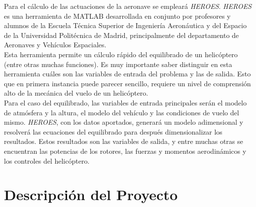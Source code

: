 Para el cálculo de las actuaciones de la aeronave se empleará \emph{HEROES}.
\emph{HEROES} es una herramienta de MATLAB desarrollada en conjunto por profesores y alumnos de la Escuela Técnica Superior de Ingeniería Aeronáutica y del Espacio de la Universidad Politécnica de Madrid, principalmente del departamento de Aeronaves y Vehículos Espaciales.\\
Esta herramienta permite un cálculo rápido del equilibrado de un helicóptero (entre otras muchas funciones). Es muy importante saber distinguir en esta herramienta cuáles son las variables de entrada del problema y las de salida. Esto que en primera instancia puede parecer sencillo, requiere un nivel de comprensión alto de la mecánica del vuelo de un helicóptero.\\
Para el caso del equilibrado, las variables de entrada principales serán el modelo de atmósfera y la altura, el modelo del vehículo y las condiciones de vuelo del mismo. \emph{HEROES}, con los datos aportados, generará un modelo adimensional y resolverá las ecuaciones del equilibrado para después dimensionalizar los resultados. Estos resultados son las variables de salida, y entre muchas otras se encuentran las potencias de los rotores, las fuerzas y momentos aerodinámicos y los controles del helicóptero.


\section{Descripción del Proyecto}



